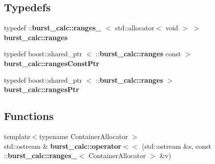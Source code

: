 \subsection*{\-Typedefs}
\begin{DoxyCompactItemize}
\item 
typedef \-::{\bf burst\-\_\-calc\-::ranges\-\_\-}\*
$<$ std\-::allocator$<$ void $>$ $>$ {\bf burst\-\_\-calc\-::ranges}
\item 
typedef boost\-::shared\-\_\-ptr\*
$<$ \-::{\bf burst\-\_\-calc\-::ranges} const  $>$ {\bf burst\-\_\-calc\-::ranges\-Const\-Ptr}
\item 
typedef boost\-::shared\-\_\-ptr\*
$<$ \-::{\bf burst\-\_\-calc\-::ranges} $>$ {\bf burst\-\_\-calc\-::ranges\-Ptr}
\end{DoxyCompactItemize}
\subsection*{\-Functions}
\begin{DoxyCompactItemize}
\item 
{\footnotesize template$<$typename Container\-Allocator $>$ }\\std\-::ostream \& {\bf burst\-\_\-calc\-::operator$<$$<$} (std\-::ostream \&s, const \-::{\bf burst\-\_\-calc\-::ranges\-\_\-}$<$ \-Container\-Allocator $>$ \&v)
\end{DoxyCompactItemize}
